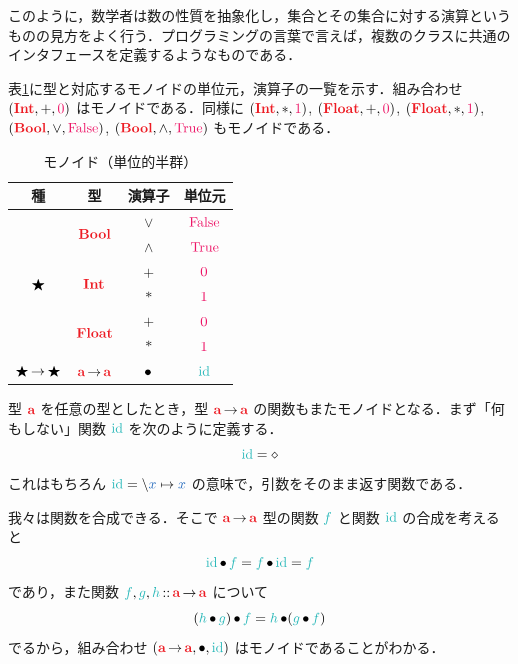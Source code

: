 \documentclass[a5paper,twoside,fleqn,draft]{jsbook}
\begin{document}
このように，数学者は数の性質を抽象化し，集合とその集合に対する演算というものの見方をよく行う．プログラミングの言葉で言えば，複数のクラスに共通のインタフェースを定義するようなものである．

表\ref{tab:monoids}に型と対応するモノイドの単位元，演算子の一覧を示す．組み合わせ $(\hInt,+,\hConstant{0})$ はモノイドである．同様に $(\hInt,*,\hConstant{1})$, $(\hFloat,+,\hConstant{0})$, $(\hFloat,*,\hConstant{1})$, $(\hBool,\hLogicalOr,\hFalse)$, $(\hBool,\hLogicalAnd,\hTrue)$ もモノイドである．

\begin{table}
\caption{モノイド（単位的半群）}
\label{tab:monoids}
\begin{center}
\begin{tabular}{||c|c|c|c||}\hline
種&型&演算子&単位元\\\hline\hline
\multirow{6}{*}{$\bigstar$}&\multirow{2}{*}{$\hBool$}&$\vee$&$\hFalse$\\
&&$\wedge$&$\hTrue$\\\cline{2-4}
&\multirow{2}{*}{$\hInt$}&$+$&$\hConstant{0}$\\
&&$*$ &$\hConstant{1}$\\\cline{2-4}
&\multirow{2}{*}{$\hFloat$}&$+$&$\hConstant{0}$\\
&&$*$&$\hConstant{1}$\\\hline
$\bigstar\operatorname{\rightarrow}\bigstar$&$\hTypeName{a}\hFunctionArrow\hTypeName{a}$ &$\operatorname{\bullet}$&$\hId$\\\hline
\end{tabular}
\end{center}
\end{table}

\separator

型 $\hTypeName{a}$ を任意の型としたとき，型 $\hTypeName{a}\hFunctionArrow\hTypeName{a}$ の関数もまたモノイドとなる．まず「何もしない」関数 $\hId$ を次のように定義する．
\begin{equation}
  \hId=\hAnonParam
\end{equation}
これはもちろん $\hId=\hLambdaSyntax{\hVar{x}}{\hVar{x}}$ の意味で，引数をそのまま返す関数である．

我々は関数を合成できる．そこで $\hTypeName{a}\hFunctionArrow\hTypeName{a}$ 型の関数 $\hFunc{f}$ と関数 $\hId$ の合成を考えると
\begin{equation}
  \hId\hCompose\hFunc{f}=\hFunc{f}\hCompose\hId=\hFunc{f}
\end{equation}
であり，また関数 $\hFunc{f},\hFunc{g},\hFunc{h}\hIsTypeOf\hTypeName{a}\hFunctionArrow\hTypeName{a}$ について
\begin{equation}
  (\hFunc{h}\hCompose\hFunc{g})\hCompose\hFunc{f}
  = \hFunc{h}\hCompose(\hFunc{g}\hCompose\hFunc{f})
\end{equation}
でるから，組み合わせ $(\hTypeName{a}\hFunctionArrow\hTypeName{a},\hCompose,\hId)$ はモノイドであることがわかる．
\end{document}
